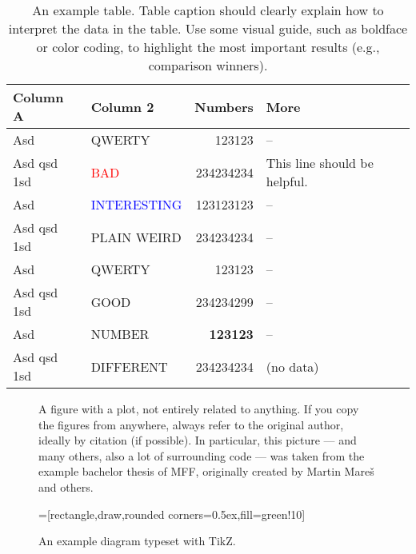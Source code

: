 \begin{table}
\centering\footnotesize\sf
\begin{tabular}{llrl}
\toprule
Column A & Column 2 & Numbers & More \\
\midrule
Asd & QWERTY & 123123 & -- \\
Asd qsd 1sd & \textcolor{red}{BAD} & 234234234 & This line should be helpful. \\
Asd & \textcolor{blue}{INTERESTING} & 123123123 & -- \\
Asd qsd 1sd & \textcolor{violet!50}{PLAIN WEIRD} & 234234234 & -- \\
Asd & QWERTY & 123123 & -- \\
\addlinespace %
Asd qsd 1sd & \textcolor{green!80!black}{GOOD} & 234234299 & -- \\
Asd & NUMBER & \textbf{123123} & -- \\
Asd qsd 1sd & DIFFERENT & 234234234 & (no data) \\
\bottomrule
\end{tabular}
\caption{An example table.  Table caption should clearly explain how to interpret the data in the table. Use some visual guide, such as boldface or color coding, to highlight the most important results (e.g., comparison winners).}
\label{tab:z}
\end{table}

\begin{figure}
\centering
\caption{A figure with a plot, not entirely related to anything. If you copy the figures from anywhere, always refer to the original author, ideally by citation (if possible). In particular, this picture --- and many others, also a lot of surrounding code --- was taken from the example bachelor thesis of MFF, originally created by Martin Mareš and others.}
\label{fig:g}
\end{figure}

\begin{figure}
\centering
{}=[rectangle,draw,rounded corners=0.5ex,fill=green!10]
\caption{An example diagram typeset with TikZ.}
\label{fig:schema}
\end{figure}

